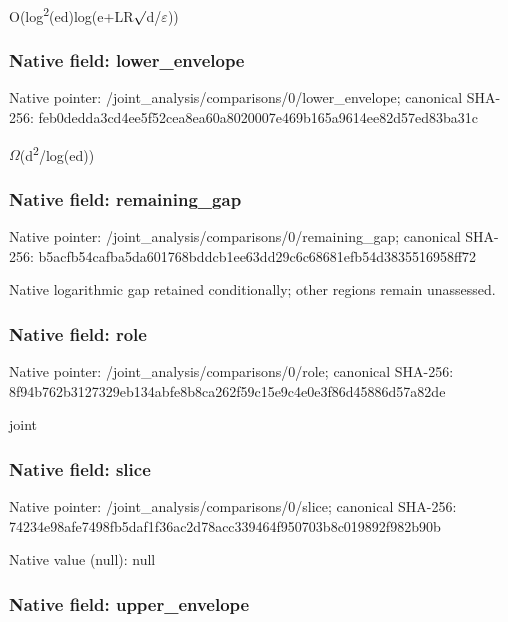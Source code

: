 \documentclass[10pt,a4paper]{article}
\begin{document}
O(log\textsuperscript{2}(ed)log(e+LR\ensuremath{\sqrt{\vphantom{x}}}d/\ensuremath{\varepsilon}))


\subsubsection{Native field: lower\_envelope}


Native pointer: /joint\_analysis/comparis\allowbreak{}ons/0/lower\_envelope; canonical SHA-256: feb0dedda3cd4ee5f52cea8e\allowbreak{}a60a8020007e469b165a9614\allowbreak{}ee82d57ed83ba31c


\ensuremath{\Omega}(d\textsuperscript{2}/log(ed))


\subsubsection{Native field: remaining\_gap}


Native pointer: /joint\_analysis/comparis\allowbreak{}ons/0/remaining\_gap; canonical SHA-256: b5acfb54cafba5da601768bd\allowbreak{}dcb1ee63dd29c6c68681efb5\allowbreak{}4d3835516958ff72


Native logarithmic gap retained conditionally; other regions remain unassessed.


\subsubsection{Native field: role}


Native pointer: /joint\_analysis/comparisons/0/role; canonical SHA-256: 8f94b762b3127329eb134abf\allowbreak{}e8b8ca262f59c15e9c4e0e3f\allowbreak{}86d45886d57a82de


joint


\subsubsection{Native field: slice}


Native pointer: /joint\_analysis/comparisons/0/slice; canonical SHA-256: 74234e98afe7498fb5daf1f3\allowbreak{}6ac2d78acc339464f950703b\allowbreak{}8c019892f982b90b



Native value (null): null



\subsubsection{Native field: upper\_envelope}
\end{document}
